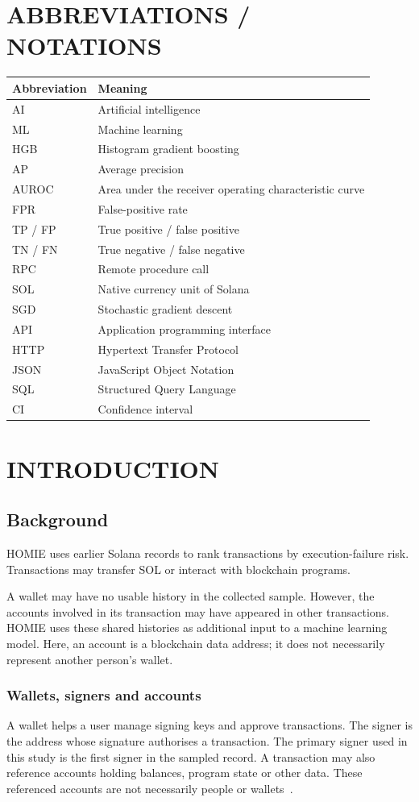 \documentclass[12pt,a4paper,oneside]{report}
\begin{document}
\chapter*{ABBREVIATIONS / NOTATIONS}
\begin{tabularx}{\textwidth}{p{30mm}Y}\toprule Abbreviation&Meaning\\\midrule
AI&Artificial intelligence\\ML&Machine learning\\HGB&Histogram gradient boosting\\AP&Average precision\\AUROC&Area under the receiver operating characteristic curve\\FPR&False-positive rate\\TP / FP&True positive / false positive\\TN / FN&True negative / false negative\\RPC&Remote procedure call\\SOL&Native currency unit of Solana\\SGD&Stochastic gradient descent\\API&Application programming interface\\HTTP&Hypertext Transfer Protocol\\JSON&JavaScript Object Notation\\SQL&Structured Query Language\\CI&Confidence interval\\\bottomrule\end{tabularx}
\clearpage{}
\chapter{INTRODUCTION}
\section{Background}
HOMIE uses earlier Solana records to rank transactions by execution-failure risk. Transactions may transfer SOL or interact with blockchain programs.

A wallet may have no usable history in the collected sample. However, the accounts involved in its transaction may have appeared in other transactions. HOMIE uses these shared histories as additional input to a machine learning model. Here, an account is a blockchain data address; it does not necessarily represent another person's wallet.

\subsection{Wallets, signers and accounts}
A wallet helps a user manage signing keys and approve transactions. The signer is the address whose signature authorises a transaction. The primary signer used in this study is the first signer in the sampled record. A transaction may also reference accounts holding balances, program state or other data. These referenced accounts are not necessarily people or wallets~\cite{accounts,transactions}.
\end{document}
